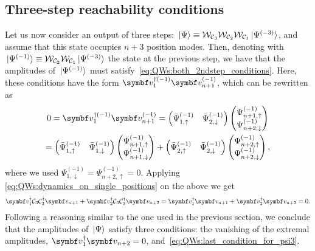 \subsection{Three-step reachability conditions}
\label{sec:QWs:3step_reachability}
Let us now consider an output of three steps:
$\ket*{\Psi} \equiv {\mathcal{W}}_{{\mathcal{C}}_3}{\mathcal{W}}_{{\mathcal{C}}_2}{\mathcal{W}}_{{\mathcal{C}}_1} \ket*{\Psi^{(-3)}}$,
and assume that this state occupies $n+3$ position modes.
Then, denoting with
$\ket*{\Psi^{(-1)}} \equiv {\mathcal{W}}_{{\mathcal{C}}_2}{\mathcal{W}}_{{\mathcal{C}}_1} \ket*{\Psi^{(-3)}}$
the state at the previous step, we have that the amplitudes of $\ket*{\Psi^{(-1)}}$ must satisfy~\cref{eq:QWs:both_2ndstep_conditions}.
Here, these conditions have the form
$\bs v_1^{\dagger(-1)} \bs v_{n+1}^{(-1)}$,
which can be rewritten as
\begin{equation}
\begin{gathered}
	0 = \bs v_1^{\dagger(-1)} \bs v_{n+1}^{(-1)} = 
	\begin{pmatrix} \bar\Psi^{(-1)}_{1,\uparrow} & \bar\Psi^{(-1)}_{2,\downarrow} \end{pmatrix}
	\begin{pmatrix} \Psi^{(-1)}_{n+1,\uparrow} \\ \Psi^{(-1)}_{n+2,\downarrow} \end{pmatrix}
	\\
	=
	\begin{pmatrix} \bar\Psi^{(-1)}_{1,\uparrow} & \bar\Psi^{(-1)}_{1,\downarrow} \end{pmatrix}
	\begin{pmatrix} \Psi^{(-1)}_{n+1,\uparrow} \\ \Psi^{(-1)}_{n+1,\downarrow} \end{pmatrix} +
	\begin{pmatrix} \bar\Psi^{(-1)}_{2,\uparrow} & \bar\Psi^{(-1)}_{2,\downarrow} \end{pmatrix}
	\begin{pmatrix} \Psi^{(-1)}_{n+2,\uparrow} \\ \Psi^{(-1)}_{n+2,\downarrow} \end{pmatrix},
\end{gathered}
\end{equation}
where we used
$\Psi^{(-1)}_{1,\downarrow} = \Psi^{(-1)}_{n+2,\uparrow} = 0$.
Applying \cref{eq:QWs:dynamics_on_single_positions} on the above we get
\begin{equation}
\begin{aligned}
    \bs v_1^{\dagger} \calC_3 \calC_3^\dagger \bs v_{n+1}+
    \bs v_2^{\dagger} \calC_3 \calC_3^\dagger \bs v_{n+2}  =
    \bs v_1^{\dagger} \bs v_{n+1} +
    \bs v_2^{\dagger} \bs v_{n+2} = 0.
\end{aligned}
\label{eq:QWs:last_condition_for_psi3}
\end{equation}
Following a reasoning similar to the one used in the previous section, we conclude that the amplitudes of $\ket*{\Psi}$ satisfy three conditions:
the vanishing of the extremal amplitudes, $\bs v_1^{\dagger} \bs v_{n+2} = 0$, and~\cref{eq:QWs:last_condition_for_psi3}.


